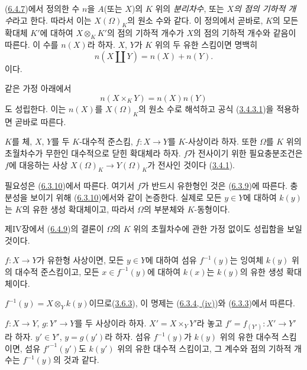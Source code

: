 \begin{env}[6.4.8]
\label{I.6.4.8-ko}
(\hyperref[I.6.4.7-ko]{6.4.7})에서 정의한 수 $n$을 $A$(또는 $X$)의
$K$ 위의 \emph{분리차수}, 또는 \emph{$X$의 점의 기하적 개수}라고 한다.
따라서 이는 $X(\Omega)_K$의 원소 수와 같다. 이 정의에서 곧바로,
$K$의 모든 확대체 $K'$에 대하여 $X\otimes_K K'$의 점의 기하적 개수가
$X$의 점의 기하적 개수와 같음이 따른다. 이 수를 $n(X)$라 하자. $X$, $Y$가
$K$ 위의 두 유한 스킴이면 명백히
\[
  n(X\amalg Y)=n(X)+n(Y).
  \tag{6.4.8.1}\label{I.6.4.8.1-ko}
\]
이다.

같은 가정 아래에서
\[
  n(X\times_K Y)=n(X)n(Y)
  \tag{6.4.8.2}\label{I.6.4.8.2-ko}
\]
도 성립한다. 이는 $n(X)$를 $X(\Omega)_K$의 원소 수로 해석하고 공식
(\hyperref[I.3.4.3.1-ko]{3.4.3.1})을 적용하면 곧바로 따른다.
\end{env}

\begin{proposition}[6.4.9]
\label{I.6.4.9-ko}
$K$를 체, $X$, $Y$를 두 $K$-대수적 준스킴,
$f:X\to Y$를 $K$-사상이라 하자. 또한 $\Omega$를 $K$ 위의 초월차수가
무한인 대수적으로 닫힌 확대체라 하자. $f$가 전사이기 위한 필요충분조건은
$f$에 대응하는 사상 $X(\Omega)_K\to Y(\Omega)_K$가 전사인 것이다
(\hyperref[I.3.4.1-ko]{3.4.1}).
\end{proposition}

필요성은 (\hyperref[I.6.3.10-ko]{6.3.10})에서 따른다. 여기서 $f$가
반드시 유한형인 것은 (\hyperref[I.6.3.9-ko]{6.3.9})에 따른다.
충분성을 보이기 위해 (\hyperref[I.6.3.10-ko]{6.3.10})에서와 같이
논증한다. 실제로 모든 $y\in Y$에 대하여 $k(y)$는 $K$의 유한 생성
확대체이고, 따라서 $\Omega$의 부분체와 $K$-동형이다.

\begin{remark}[6.4.10]
\label{I.6.4.10-ko}
제IV장에서 (\hyperref[I.6.4.9-ko]{6.4.9})의 결론이 $\Omega$의 $K$ 위의
초월차수에 관한 가정 없이도 성립함을 보일 것이다.
\end{remark}

\begin{proposition}[6.4.11]
\label{I.6.4.11-ko}
$f:X\to Y$가 유한형 사상이면, 모든 $y\in Y$에 대하여 섬유
$f^{-1}(y)$는 잉여체 $k(y)$ 위의 대수적 준스킴이고, 모든
$x\in f^{-1}(y)$에 대하여 $k(x)$는 $k(y)$의 유한 생성 확대체이다.
\end{proposition}

$f^{-1}(y)=X\otimes_Y k(y)$이므로(\hyperref[I.3.6.3-ko]{3.6.3}), 이 명제는
(\hyperref[I.6.3.4-ko]{6.3.4, (iv)})와
(\hyperref[I.6.3.3-ko]{6.3.3})에서 따른다.

\begin{proposition}[6.4.12]
\label{I.6.4.12-ko}
$f:X\to Y$, $g:Y'\to Y$를 두 사상이라 하자.
$X'=X\times_Y Y'$라 놓고 $f'=f_{(Y')}:X'\to Y'$라 하자.
$y'\in Y'$, $y=g(y')$라 하자. 섬유 $f^{-1}(y)$가 $k(y)$ 위의 유한
대수적 스킴이면, 섬유 $f'^{-1}(y')$도 $k(y')$ 위의 유한 대수적
스킴이고, 그 계수와 점의 기하적 개수는 $f^{-1}(y)$의 것과 같다.
\end{proposition}

